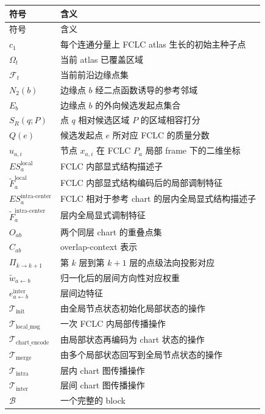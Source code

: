 \documentclass[12pt,a4paper]{ctexart}
\begin{document}
\begin{longtable}{p{3.2cm}p{10.2cm}}
\toprule
符号 & 含义 \\
\midrule
\endfirsthead
\toprule
符号 & 含义 \\
\midrule
\endhead
\bottomrule
\endfoot

\(c_1\) & 每个连通分量上 FCLC atlas 生长的初始主种子点 \\
\(\Omega_t\) & 当前 atlas 已覆盖区域 \\
\(\mathcal F_t\) & 当前前沿边缘点集 \\
\(N_2(b)\) & 边缘点 \(b\) 经二点函数诱导的参考邻域 \\
\(E_b\) & 边缘点 \(b\) 的外向候选发起点集合 \\
\(S_R(q;P)\) & 点 \(q\) 相对候选区域 \(P\) 的区域相容打分 \\
\(Q(e)\) & 候选发起点 \(e\) 所对应 FCLC 的质量分数 \\
\(u_{a,i}\) & 节点 \(x_{a,i}\) 在 FCLC \(P_a\) 局部 frame 下的二维坐标 \\
\(ES_a^{\mathrm{local}}\) & FCLC 内部显式结构描述子 \\
\(\tilde F_a^{\mathrm{local}}\) & FCLC 内部显式结构编码后的局部调制特征 \\
\(ES_a^{\mathrm{intra\text{-}center}}\) & FCLC 相对于参考 chart 的层内全局显式结构描述子 \\
\(\tilde F_a^{\mathrm{intra\text{-}center}}\) & 层内全局显式调制特征 \\
\(O_{ab}\) & 两个同层 chart 的重叠点集 \\
\(C_{ab}\) & overlap-context 表示 \\
\(\Pi_{k\to k+1}\) & 第 \(k\) 层到第 \(k+1\) 层的点级法向投影对应 \\
\(\tilde w_{a\leftarrow b}\) & 归一化后的层间方向性对应权重 \\
\(e_{a\leftarrow b}^{\mathrm{inter}}\) & 层间边特征 \\
\(\mathcal T_{\mathrm{init}}\) & 由全局节点状态初始化局部状态的操作 \\
\(\mathcal T_{\mathrm{local\_msg}}\) & 一次 FCLC 内局部传播操作 \\
\(\mathcal T_{\mathrm{chart\_encode}}\) & 由局部状态再编码为 chart 状态的操作 \\
\(\mathcal T_{\mathrm{merge}}\) & 由多个局部状态回写到全局节点状态的操作 \\
\(\mathcal T_{\mathrm{intra}}\) & 层内 chart 图传播操作 \\
\(\mathcal T_{\mathrm{inter}}\) & 层间 chart 图传播操作 \\
\(\mathcal B\) & 一个完整的 block \\
\end{longtable}
\end{document}
